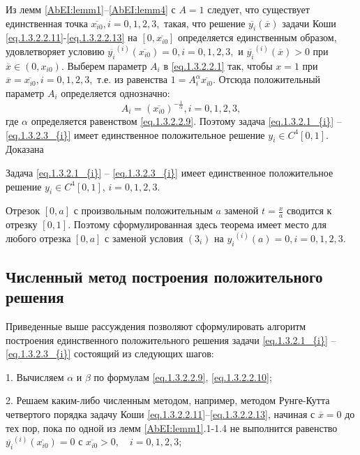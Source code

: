 {Из лемм \ref{AbEI:lemm1}--\ref{AbEI:lemm4} с $ A=1 $ следует, что существует единственная
 точка $ \overline {x_{i0}},i=0,1,2,3, $  такая, что решение
$ \overline{y_i}(\overline {x}) $ задачи Коши \eqref{eq.1.3.2.2.11}-\eqref{eq.1.3.2.2.13} на
$ [0,\overline {x_{i0}}] $ определяется единственным образом, удовлетворяет условию
$ {\overline{y_i}}^{(i)}(\overline {x_{i0}})=0, i=0,1,2,3, $ и
$ {\overline{y_i}}^{(i)}(\overline {x})>0 $ при $ \overline {x} \in (0,x_{i0}). $
Выберем параметр $ A_i $  в \eqref{eq.1.3.2.2.1} так, чтобы $ x=1 $ при
$  \overline {x}=\overline {x_{i0}},i=0,1,2,3, $ т.е. из равенства
$ 1=A_i^{\alpha}\overline {x_{i0}}. $
Отсюда положительный параметр $ A_i $ определяется однозначно:
\begin{equation}\label{eq.1.3.2.2.14}
A_i=(\overline {x_{i0}})^{-\frac{1}{\alpha}}, i=0,1,2,3,
\end{equation}
где $ \alpha $ определяется равенством \eqref{eq.1.3.2.2.9}. Поэтому задача \eqref{eq.1.3.2.1_{i}} -- \eqref{eq.1.3.2.3_{i}}
имеет единственное положительное решение $ y_i \in C^4[0,1] $. Доказана

\begin{theorem}\label{AbEI:th1} Задача \eqref{eq.1.3.2.1_{i}} -- \eqref{eq.1.3.2.3_{i}} имеет единственное
положительное решение $y_i \in C^4[0,1]$, $i=0,1,2,3. $
\end{theorem}

\begin{remark}\label{AbEI:remrk1}  Отрезок $[0,a]$ с  произвольным
положительным $ a $ заменой $ t=\frac{x}{a} $  сводится к отрезку $[0,1]$.
Поэтому сформулированная здесь теорема имеет место  для любого отрезка
$ [0,a] $  с заменой условия $ (3_i) $ на $ {y_i}^{(i)}(a)=0, i=0,1,2,3.$
\end{remark}

\subsection{Численный метод построения положительного решения}

Приведенные выше рассуждения позволяют сформулировать алгоритм построения единственного положительного решения задачи \eqref{eq.1.3.2.1_{i}} -- \eqref{eq.1.3.2.3_{i}} состоящий из следующих шагов:

1. Вычисляем $ \alpha $  и $ \beta $   по формулам \eqref{eq.1.3.2.2.9}, \eqref{eq.1.3.2.2.10};

2. Решаем каким-либо численным методом, например, методом Рунге-Кутта
четвертого порядка задачу Коши \eqref{eq.1.3.2.2.11}--\eqref{eq.1.3.2.2.13}, начиная с $ \overline {x}=0 $
до тех пор, пока по одной из лемм \ref{AbEI:lemm1}.1-1.4 не выполнится равенство
$ {\overline{y_i}}^{(i)}(\overline {x_{i0}})=0 $   с
$ \overline {x_{i0}}>0,\quad i=0,1,2,3; $

}
